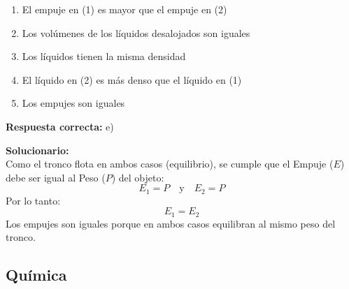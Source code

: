 \begin{enumerate}
	\begin{enumerate}[label=\alph*)]
		\item El empuje en (1) es mayor que el empuje en (2)
		\item Los volúmenes de los líquidos desalojados son iguales
		\item Los líquidos tienen la misma densidad
		\item El líquido en (2) es más denso que el líquido en (1)
		\item Los empujes son iguales
	\end{enumerate}
	\textbf{Respuesta correcta:} e)
	
	\vspace{2mm}
	\textbf{Solucionario:}\\
	Como el tronco flota en ambos casos (equilibrio), se cumple que el Empuje ($E$) debe ser igual al Peso ($P$) del objeto:
	\[ E_1 = P \quad \text{y} \quad E_2 = P \]
	Por lo tanto:
	\[ E_1 = E_2 \]
	Los empujes son iguales porque en ambos casos equilibran al mismo peso del tronco.
	
	\vspace{6mm}
	
\end{enumerate}





\subsection*{Química}

